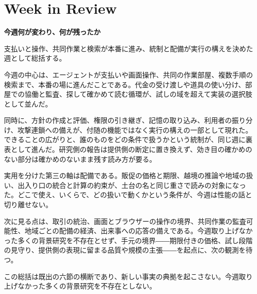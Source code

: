 \section{Week in Review}
\begin{wideflow}
{\Large\bfseries 今週何が変わり、何が残ったか}\par
\smallskip
{\color{SurveyMuted}支払いと操作、共同作業と検索が本番に進み、統制と配備が実行の構えを決めた週として総括する。}\par
\end{wideflow}

\noindent 今週の中心は、エージェントが支払いや画面操作、共同の作業部屋、複数手順の検索まで、本番の場に進んだことである。代金の受け渡しや道具の使い分け、部屋での協働と監査、探して確かめて読む循環が、試しの域を超えて実装の選択肢として並んだ。 \cite{w2026w34w34eventc010,w2026w34w34eventc012,w2026w34w34eventc019}\par\medskip

\noindent 同時に、方針の作成と評価、権限の引き継ぎ、記憶の取り込み、利用者の振り分け、攻撃連鎖への備えが、付随の機能ではなく実行の構えの一部として現れた。できることの広がりと、誰のものをどの条件で扱うかという統制が、同じ週に裏表として進んだ。研究側の報告は提供側の断定に置き換えず、効き目の確かめのない部分は確かめのないまま残す読み方が要る。 \cite{w2026w34w34eventc087,w2026w34w34eventc004,w2026w34w34eventc055}\par\medskip

\noindent 実用を分けた第三の軸は配備である。販促の価格と期限、越境の推論や地域の扱い、出入り口の統合と計算の約束が、土台の名と同じ重さで読みの対象になった。どこで使え、いくらで、どの扱いで動くかという条件が、今週は性能の話と切り離せない。 \cite{w2026w34w34eventc017,w2026w34w34eventc030,w2026w34w34eventc003}\par\medskip

\noindent 次に見る点は、取引の統治、画面とブラウザーの操作の境界、共同作業の監査可能性、地域ごとの配備の経済、出来事への応答の備えである。今週取り上げなかった多くの背景研究を不存在とせず、手元の境界――期限付きの価格、試し段階の見守り、提供側の表現に留まる品質や規模の主張――を起点に、次の観測を待つ。 \cite{w2026w34w34eventc026,w2026w34w34eventc008,w2026w34w34eventc091}\par\medskip

\begin{claimboundary}[この総括の読み方]
この総括は既出の六節の横断であり、新しい事実の典拠を起こさない。今週取り上げなかった多くの背景研究を不存在としない。
\end{claimboundary}
